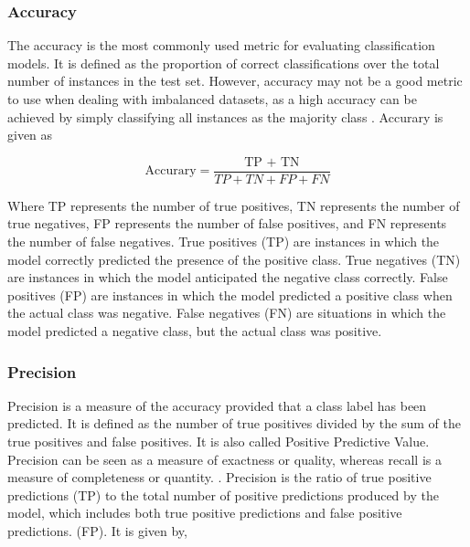 \documentclass{article}[12pt]
\theoremstyle{definition}
\begin{document}
\bigskip

\subsubsection{Accuracy}

\bigskip

The accuracy is the most commonly used metric for evaluating classification models. It is defined as the proportion of correct classifications over the total number of instances in the test set. However, accuracy may not be a good metric to use when dealing with imbalanced datasets, as a high accuracy can be achieved by simply classifying all instances as the majority class \cite{galar2012review}. Accurary is given as 

$$ \text{Accurary} = \frac{\text{TP + TN}}{TP + TN + FP + FN}$$

\medskip

\noindent
Where TP represents the number of true positives, TN represents the number of true negatives, FP represents the number of false positives, and FN represents the number of false negatives. True positives (TP) are instances in which the model correctly predicted the presence of the positive class. True negatives (TN) are instances in which the model anticipated the negative class correctly. False positives (FP) are instances in which the model predicted a positive class when the actual class was negative. False negatives (FN) are situations in which the model predicted a negative class, but the actual class was positive.

\bigskip

\subsubsection{Precision}

\bigskip

Precision is a measure of the accuracy provided that a class label has been predicted. It is defined as the number of true positives divided by the sum of the true positives and false positives. It is also called Positive Predictive Value. Precision can be seen as a measure of exactness or quality, whereas recall is a measure of completeness or quantity. \cite{davis2006evaluation}. Precision is the ratio of true positive predictions (TP) to the total number of positive predictions produced by the model, which includes both true positive predictions and false positive predictions. (FP). It is given by,
\end{document}
